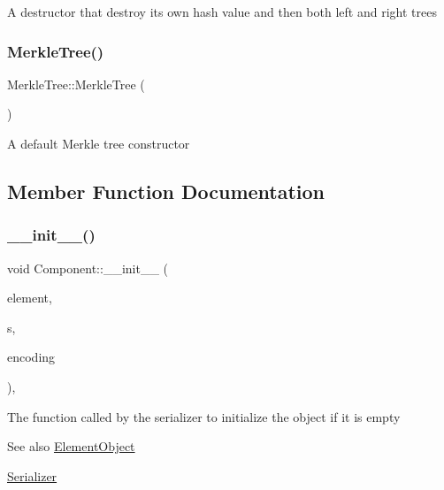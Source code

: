 A destructor that destroy its own hash value and then both left and right trees \mbox{\label{classMerkleTree_a6e639010fea282326c335403493d38b6}} 
\subsubsection{\texorpdfstring{Merkle\+Tree()}{MerkleTree()}\hspace{0.1cm}{\footnotesize\ttfamily [4/4]}}
{\footnotesize\ttfamily Merkle\+Tree\+::\+Merkle\+Tree (\begin{DoxyParamCaption}{ }\end{DoxyParamCaption})}

A default Merkle tree constructor 

\subsection{Member Function Documentation}
\mbox{\label{classComponent_a28212595f8ee85fe009bd233bc99b2fc}} 
\subsubsection{\texorpdfstring{\+\_\+\+\_\+init\+\_\+\+\_\+()}{\_\_init\_\_()}}
{\footnotesize\ttfamily void Component\+::\+\_\+\+\_\+init\+\_\+\+\_\+ (\begin{DoxyParamCaption}\item[{\mbox{\hyperlink{classElementObject}{Element\+Object}} $\ast$}]{element,  }\item[{const \mbox{\hyperlink{classSerializer}{Serializer}} $\ast$}]{s,  }\item[{const char $\ast$}]{encoding }\end{DoxyParamCaption})\hspace{0.3cm}{\ttfamily [inline]}, {\ttfamily [inherited]}}

The function called by the serializer to initialize the object if it is empty \begin{DoxySeeAlso}{See also}
\mbox{\hyperlink{classElementObject}{Element\+Object}} 

\mbox{\hyperlink{classSerializer}{Serializer}}
\end{DoxySeeAlso}

